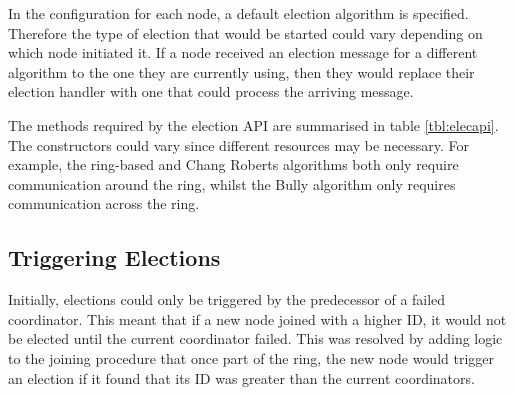 \documentclass[12pt]{article}
\begin{document}
In the configuration for each node, a default election algorithm is specified. Therefore the type of election that would be started could vary depending on which node initiated it. If a node received an election message for a different algorithm to the one they are currently using, then they would replace their election handler with one that could process the arriving message. 

The methods required by the election API are summarised in table \ref{tbl:elecapi}. The constructors could vary since different resources may be necessary. For example, the ring-based and Chang Roberts algorithms both only require communication around the ring, whilst the Bully algorithm only requires communication across the ring.

\begin{table}[!ht]
\centering
{}
\caption{Methods of the election handler interface.}
\label{tbl:elecapi}
\end{table}

\subsection{Triggering Elections}

Initially, elections could only be triggered by the predecessor of a failed coordinator. This meant that if a new node joined with a higher ID, it would not be elected until the current coordinator failed. This was resolved by adding logic to the joining procedure that once part of the ring, the new node would trigger an election if it found that its ID was greater than the current coordinators. 
\end{document}
